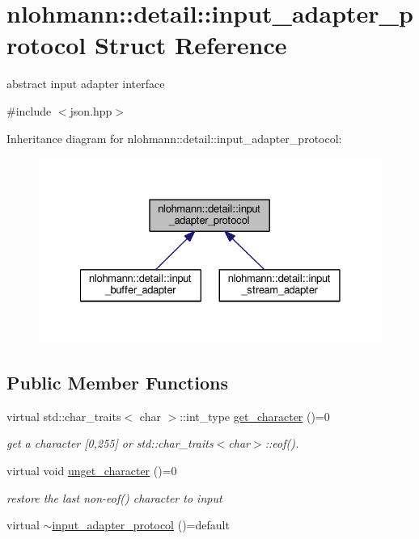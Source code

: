 \hypertarget{structnlohmann_1_1detail_1_1input__adapter__protocol}{}\section{nlohmann\+:\+:detail\+:\+:input\+\_\+adapter\+\_\+protocol Struct Reference}
\label{structnlohmann_1_1detail_1_1input__adapter__protocol}


abstract input adapter interface  




{\ttfamily \#include $<$json.\+hpp$>$}



Inheritance diagram for nlohmann\+:\+:detail\+:\+:input\+\_\+adapter\+\_\+protocol\+:
\nopagebreak
\begin{figure}[H]
\begin{center}
\leavevmode
\includegraphics[width=328pt]{structnlohmann_1_1detail_1_1input__adapter__protocol__inherit__graph}
\end{center}
\end{figure}
\subsection*{Public Member Functions}
\begin{DoxyCompactItemize}
\item 
virtual std\+::char\+\_\+traits$<$ char $>$\+::int\+\_\+type \hyperlink{structnlohmann_1_1detail_1_1input__adapter__protocol_aac10a6a4048a8ce8e2ed50277692a3ca}{get\+\_\+character} ()=0
\begin{DoxyCompactList}\small\item\em get a character \mbox{[}0,255\mbox{]} or std\+::char\+\_\+traits$<$char$>$\+::eof(). \end{DoxyCompactList}\item 
virtual void \hyperlink{structnlohmann_1_1detail_1_1input__adapter__protocol_aeb5cac3e86e8df6cfe48cc42de2e9225}{unget\+\_\+character} ()=0
\begin{DoxyCompactList}\small\item\em restore the last non-\/eof() character to input \end{DoxyCompactList}\item 
virtual \hyperlink{structnlohmann_1_1detail_1_1input__adapter__protocol_a92dac74def4ac5adacd0684088bd4082}{$\sim$input\+\_\+adapter\+\_\+protocol} ()=default
\end{DoxyCompactItemize}


